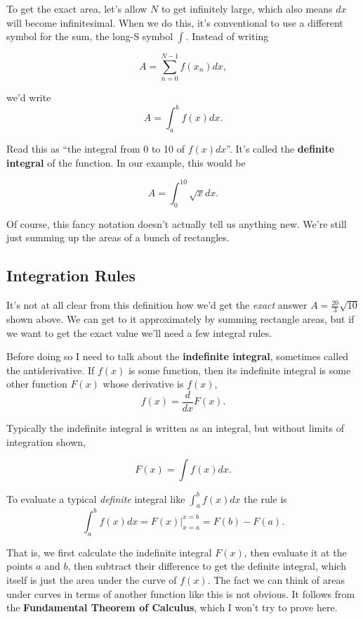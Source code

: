 \documentclass[
  letterpaper,
  DIV=11,
  numbers=noendperiod]{scrreprt}
\begin{document}
To get the exact area, let's allow \(N\) to get infinitely large, which
also means \(dx\) will become infinitesimal. When we do this, it's
conventional to use a different symbol for the sum, the long-S symbol
\(\int\). Instead of writing

\[A = \sum_{n=0}^{N-1} f(x_n) dx,\]

we'd write \[A = \int_a^{b} f(x) dx.\]

Read this as ``the integral from 0 to 10 of \(f(x)dx\)''. It's called
the \textbf{definite integral} of the function. In our example, this
would be

\[A = \int_0^{10} \sqrt{x} dx.\]

Of course, this fancy notation doesn't actually tell us anything new.
We're still just summing up the areas of a bunch of rectangles.

\hypertarget{integration-rules}{%
\subsection{Integration Rules}\label{integration-rules}}

It's not at all clear from this definition how we'd get the \emph{exact}
answer \(A=\frac{20}{3}\sqrt{10}\) shown above. We can get to it
approximately by summing rectangle areas, but if we want to get the
exact value we'll need a few integral rules.

Before doing so I need to talk about the \textbf{indefinite integral},
sometimes called the antiderivative. If \(f(x)\) is some function, then
its indefinite integral is some other function \(F(x)\) whose derivative
is \(f(x)\), \[f(x) = \frac{d}{dx} F(x).\]

Typically the indefinite integral is written as an integral, but without
limits of integration shown,

\[F(x) = \int f(x) dx.\]

To evaluate a typical \emph{definite} integral like \(\int_a^b f(x) dx\)
the rule is
\[\int_a^b f(x) dx = F(x) \bigg|_{x=a}^{x=b} = F(b) - F(a).\]

That is, we first calculate the indefinite integral \(F(x)\), then
evaluate it at the points \(a\) and \(b\), then subtract their
difference to get the definite integral, which itself is just the area
under the curve of \(f(x)\). The fact we can think of areas under curves
in terms of another function like this is not obvious. It follows from
the \textbf{Fundamental Theorem of Calculus}, which I won't try to prove
here.
\end{document}
